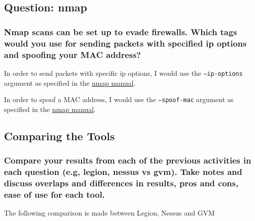 \subsection{Question: nmap}
\subsubsection{Nmap scans can be set up to evade firewalls. Which tags would you use for sending packets with specified ip options and spoofing your MAC address?}
In order to send packets with specific ip options, I would use the \texttt{--ip-options} argument as specified in the \href{https://nmap.org/book/man-bypass-firewalls-ids.html}{nmap manual}.

In order to spoof a MAC address, I would use the \texttt{--spoof-mac} argument as specified in the \href{https://nmap.org/book/man-bypass-firewalls-ids.html}{nmap manual}.

\subsection{Comparing the Tools}
\subsubsection{Compare your results from each of the previous activities in each question (e.g, legion, nessus vs gvm). Take notes and discuss overlaps and differences in results, pros and cons, ease of use for each tool.}
The following comparison is made between Legion, Nessus and GVM

